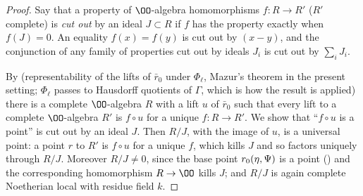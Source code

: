 \begin{proof}
Say that a property of $\OO$-algebra homomorphisms $f:R\to R'$ ($R'$ complete) is \emph{cut out} by an ideal $J\subset R$ if $f$ has
the property exactly when $f(J)=0$. An equality $f(x)=f(y)$ is cut out by $(x-y)$, and the conjunction of any family of properties
cut out by ideals $J_i$ is cut out by $\sum_iJ_i$.

By  (representability of the lifts of $\bar r_0$ under $\Phi_\ell$, Mazur's theorem \cite{Mazur1989} in
the present setting; $\Phi_\ell$ passes to Hausdorff quotients of $\Gamma$, which is how the result is applied) there is a complete
$\OO$-algebra $R$ with a lift $u$ of $\bar r_0$ such that every lift to a complete $\OO$-algebra $R'$ is $f\circ u$ for a unique
$f:R\to R'$. We show that ``$f\circ u$ is a point'' is cut out by an ideal $J$. Then $R/J$, with the image of $u$, is a universal
point: a point $r$ to $R'$ is $f\circ u$ for a unique $f$, which kills $J$ and so factors uniquely through $R/J$. Moreover $R/J\ne0$,
since the base point $r_0(\eta,\Psi)$ is a point () and the corresponding
homomorphism $R\to\OO$ kills $J$; and $R/J$ is again complete Noetherian local with residue field $k$.


\end{proof}
